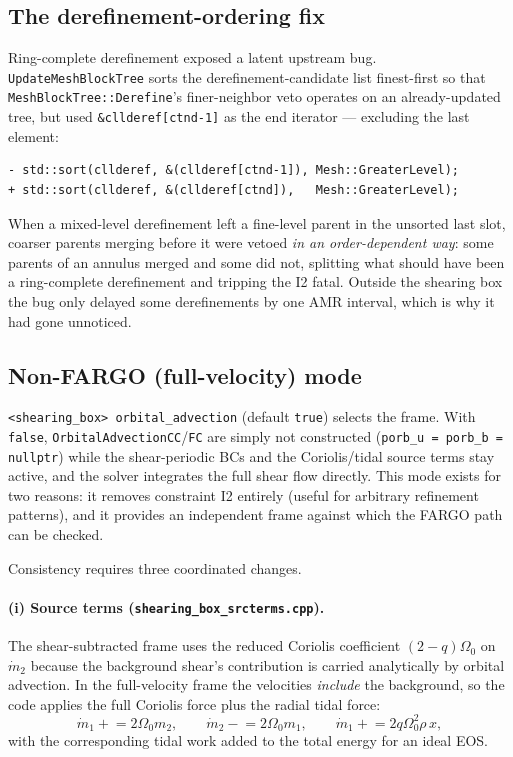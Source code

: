 \documentclass[11pt]{article}
\newcommand{\code}[1]{\texttt{#1}}
\newcommand{\file}[1]{\texttt{\small #1}}
\newcommand{\fn}[1]{\texttt{\small #1}}
\newcommand{\Om}{\Omega_0}
\begin{document}
\subsection{The derefinement-ordering fix}
\label{sec:sortfix}

Ring-complete derefinement exposed a latent upstream bug. \fn{UpdateMeshBlockTree}
sorts the derefinement-candidate list finest-first so that
\fn{MeshBlockTree::Derefine}'s finer-neighbor veto operates on an already-updated tree,
but used \code{\&cllderef[ctnd-1]} as the end iterator --- excluding the last element:

\begin{lstlisting}
- std::sort(cllderef, &(cllderef[ctnd-1]), Mesh::GreaterLevel);
+ std::sort(cllderef, &(cllderef[ctnd]),   Mesh::GreaterLevel);
\end{lstlisting}

When a mixed-level derefinement left a fine-level parent in the unsorted last slot,
coarser parents merging before it were vetoed \emph{in an order-dependent way}: some
parents of an annulus merged and some did not, splitting what should have been a
ring-complete derefinement and tripping the I2 fatal. Outside the shearing box the
bug only delayed some derefinements by one AMR interval, which is why it had gone
unnoticed.

\subsection{Non-FARGO (full-velocity) mode}
\label{sec:nofargo}

\code{<shearing\_box> orbital\_advection} (default \code{true}) selects the frame.
With \code{false}, \code{OrbitalAdvectionCC}/\code{FC} are simply not constructed
(\code{porb\_u = porb\_b = nullptr}) while the shear-periodic BCs and the Coriolis/tidal
source terms stay active, and the solver integrates the full shear flow directly. This
mode exists for two reasons: it removes constraint I2 entirely (useful for arbitrary
refinement patterns), and it provides an independent frame against which the FARGO
path can be checked.

Consistency requires three coordinated changes.

\paragraph{(i) Source terms (\file{shearing\_box\_srcterms.cpp}).} The shear-subtracted
frame uses the reduced Coriolis coefficient $(2-q)\Om$ on $\dot{m}_2$ because the
background shear's contribution is carried analytically by orbital advection. In the
full-velocity frame the velocities \emph{include} the background, so the code applies
the full Coriolis force plus the radial tidal force:
\begin{equation}
  \dot{m}_1 \mathrel{+}= 2\Om m_2, \qquad
  \dot{m}_2 \mathrel{-}= 2\Om m_1, \qquad
  \dot{m}_1 \mathrel{+}= 2q\Om^2 \rho\, x ,
\end{equation}
with the corresponding tidal work added to the total energy for an ideal EOS.
\end{document}
